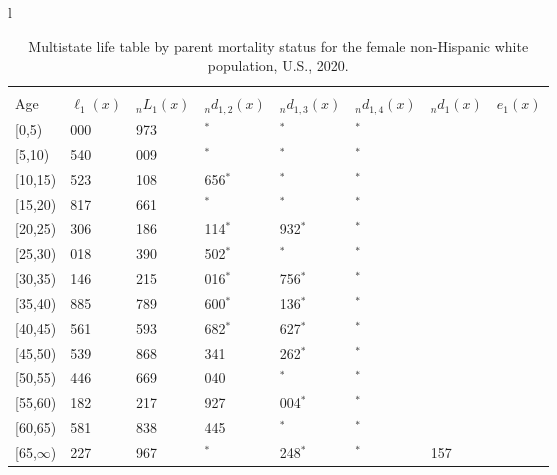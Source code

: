 \documentclass[
]{article}
\begin{document}
\begin{table}
\caption{\label{tab:table-nhwhite-female}Multistate life table by parent mortality status for the female non-Hispanic white population, U.S., 2020.}

\centering
\fontsize{9}{11}\selectfont
\begin{tabular}[t]{l}
\hline
\begin{tabular}{>{\raggedright\arraybackslash}p{.45in}>{\raggedleft\arraybackslash}p{.65in}>{\raggedleft\arraybackslash}p{.65in}>{\raggedleft\arraybackslash}p{.65in}>{\raggedleft\arraybackslash}p{.65in}>{\raggedleft\arraybackslash}p{.65in}>{\raggedleft\arraybackslash}p{.65in}>{\raggedleft\arraybackslash}p{.65in}}
\toprule
\multicolumn{1}{c}{ } & \multicolumn{7}{c}{(1) Lost neither} \\
\cmidrule(l{3pt}r{3pt}){2-8}
Age & $\ell_{1}(x)$ & ${}_nL_{1}(x)$ & ${}_nd_{1,2}(x)$ & ${}_nd_{1,3}(x)$ & ${}_nd_{1,4}(x)$ & ${}_nd_{1}(x)$ & $e_{1}(x)$\\
\midrule
{}[0,5) & 100 000 & 494 973 & 0$^{*}$ & 0$^{*}$ & 0$^{*}$ & 460 & 47\\
{}[5,10) & 99 540 & 492 009 & 980$^{*}$ & 0$^{*}$ & 0$^{*}$ & 37 & 42\\
{}[10,15) & 98 523 & 485 108 & 2 656$^{*}$ & 0$^{*}$ & 0$^{*}$ & 50 & 37\\
{}[15,20) & 95 817 & 481 661 & 370$^{*}$ & 0$^{*}$ & 0$^{*}$ & 140 & 32\\
{}[20,25) & 95 306 & 455 186 & 2 114$^{*}$ & 1 932$^{*}$ & 0$^{*}$ & 243 & 27\\
\addlinespace
{}[25,30) & 91 018 & 450 390 & 1 502$^{*}$ & 0$^{*}$ & 0$^{*}$ & 370 & 23\\
{}[30,35) & 89 146 & 427 215 & 1 016$^{*}$ & 1 756$^{*}$ & 0$^{*}$ & 489 & 18\\
{}[35,40) & 85 885 & 382 789 & 2 600$^{*}$ & 2 136$^{*}$ & 0$^{*}$ & 588 & 14\\
{}[40,45) & 80 561 & 360 593 & 1 682$^{*}$ & 2 627$^{*}$ & 0$^{*}$ & 713 & 10\\
{}[45,50) & 75 539 & 275 868 & 7 341 & 3 262$^{*}$ & 713$^{*}$ & 777 & 6\\
\addlinespace
{}[50,55) & 63 446 & 183 669 & 6 040 & 474$^{*}$ & 0$^{*}$ & 750 & 4\\
{}[55,60) & 56 182 & 110 217 & 4 927 & 3 004$^{*}$ & 0$^{*}$ & 670 & 2\\
{}[60,65) & 47 581 & 30 838 & 3 445 & 309$^{*}$ & 327$^{*}$ & 273 & 1\\
{}[65,$\infty$) & 43 227 & 22 967 & 726$^{*}$ & 1 248$^{*}$ & 722$^{*}$ & 1 157 & 0\\

\end{tabular}
\end{tabular}
\end{table}
\end{document}
